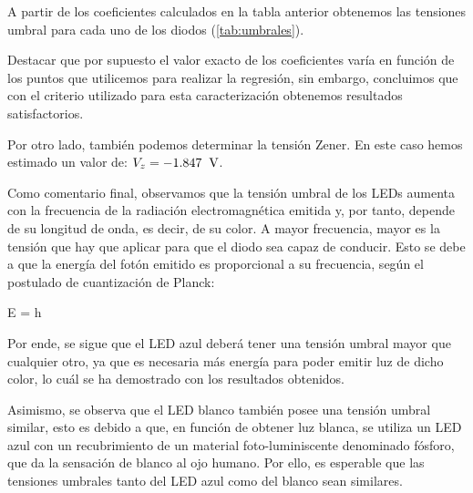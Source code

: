 \documentclass[10pt,a4paper]{article}
\begin{document}
\medskip
A partir de los coeficientes calculados en la tabla anterior obtenemos las tensiones umbral para cada uno de los diodos (\cref{tab:umbrales}).

\medskip
Destacar que por supuesto el valor exacto de los coeficientes varía en función de los puntos que utilicemos para realizar la regresión, sin embargo, concluimos que con el criterio utilizado para esta caracterización obtenemos resultados satisfactorios.

\medskip
Por otro lado, también podemos determinar la tensión Zener. En este caso hemos estimado un valor de: $V_z = -1.847\hspace{0.2cm}\text{V}$.

\medskip
Como comentario final, observamos que la tensión umbral de los LEDs aumenta con la frecuencia de la radiación electromagnética emitida y, por tanto, depende de su longitud de onda, es decir, de su color. A mayor frecuencia, mayor es la tensión que hay que aplicar para que el diodo sea capaz de conducir. Esto se debe a que la energía del fotón emitido es proporcional a su frecuencia, según el postulado de cuantización de Planck:
\begin{destacada}
    E = h\nu
\end{destacada}

\medskip
Por ende, se sigue que el LED azul deberá tener una tensión umbral mayor que cualquier otro, ya que es necesaria más energía para poder emitir luz de dicho color, lo cuál se ha demostrado con los resultados obtenidos.

\medskip
Asimismo, se observa que el LED blanco también posee una tensión umbral similar, esto es debido a que, en función de obtener luz blanca, se utiliza un LED azul con un recubrimiento de un material foto-luminiscente denominado fósforo, que da la sensación de blanco al ojo humano. Por ello, es esperable que las tensiones umbrales tanto del LED azul como del blanco sean similares.

\begin{figure}[htbp]
  \centering
  \begin{minipage}[c]{0.46\linewidth}\centering
    
  \end{minipage}\hfill
  \begin{minipage}[c]{0.5\linewidth}
    \label{fig:energia}
  \end{minipage}
\end{figure}

{\small

}
\end{document}

